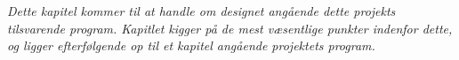 \textit{Dette kapitel kommer til at handle om designet angående dette projekts tilsvarende program. Kapitlet kigger på de mest væsentlige punkter indenfor dette, og ligger efterfølgende op til et kapitel angående projektets program.}